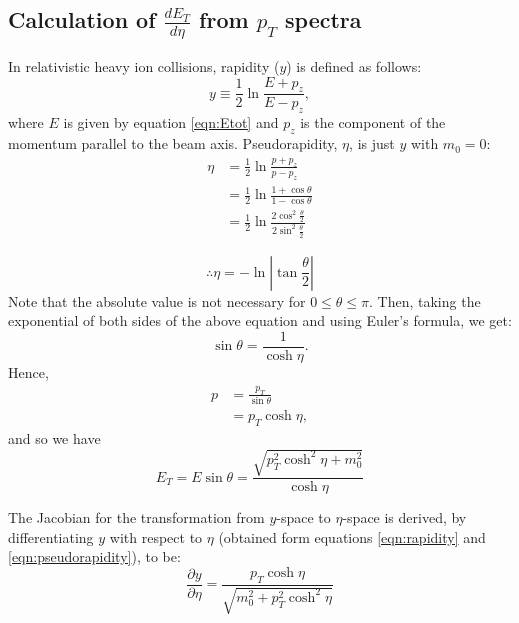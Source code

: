\subsection{Calculation of $\frac{dE_{T}}{d\eta}$ from $p_{T}$ spectra}\label{section:calcFromSpectra}
In relativistic heavy ion collisions, rapidity ($y$) is defined as follows:
\begin{equation}\label{eqn:rapidity}
y\equiv\frac{1}{2}\ln{\frac{E + p_{z}}{E - p_{z}}},
\end{equation}
where $E$ is given by equation \ref{eqn:Etot} and $p_{z}$ is the component of the momentum parallel to the beam axis.
Pseudorapidity, $\eta$, is just $y$ with $m_{0} = 0$:
\begin{align*}\label{derivation:pseudorapidity}
\eta &= \frac{1}{2}\ln{\frac{p + p_{z}}{p - p_{z}}}\\
&= \frac{1}{2}\ln{\frac{1 + \cos{\theta}}{1 - \cos{\theta}}}\\
&= \frac{1}{2}\ln{\frac{2\cos^2{\frac{\theta}{2}}}{2\sin^2{\frac{\theta}{2}}}}
\end{align*}

\begin{equation}\label{eqn:pseudorapidity}
\therefore \eta = -\ln{\left|{\tan{\frac{\theta}{2}}}\right|}
\end{equation}
Note that the absolute value is not necessary for $0 \leq \theta  \leq \pi$. Then, taking the exponential of both sides of the above equation and using Euler's formula, we get:
\begin{equation}
\sin\theta = \frac{1}{\cosh\eta}.
\end{equation}
Hence,
\begin{align*}
p &= \frac{p_{T}}{\sin\theta}\\
&= p_{T}\cosh\eta,
\end{align*}
and so we have
\begin{equation}\label{eqn:ET-as-pTOverJacobian}
E_{T} = E\sin\theta = \frac{\sqrt{p_{T}^2\cosh^2\eta+m_{0}^2}}{\cosh\eta} 
\end{equation}

The Jacobian for the transformation from $y$-space to $\eta$-space is derived, by differentiating $y$ with respect to $\eta$ (obtained form equations \ref{eqn:rapidity} and \ref{eqn:pseudorapidity}), to be:
\begin{equation}\label{eqn:Jacobian}
\frac{\partial y}{\partial \eta} = \frac{p_{T}\cosh\eta}{\sqrt{m_{0}^2+p_{T}^2\cosh^2\eta}}
\end{equation}


